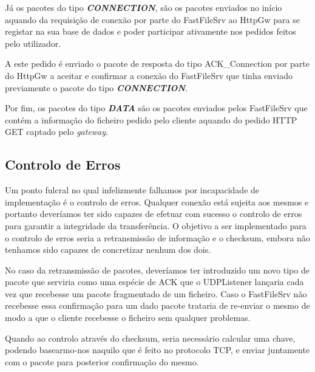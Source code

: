\documentclass[11pt]{article}
\begin{document}
\par Já os pacotes do tipo \textit{\textbf{CONNECTION}}, são os pacotes enviados no início aquando da requisição de conexão por parte do FastFileSrv ao HttpGw para se registar na sua base de dados e poder participar ativamente nos pedidos feitos pelo utilizador.\\

\par A este pedido é enviado o pacote de resposta do tipo ACK\_Connection por parte do HttpGw a aceitar e confirmar a conexão do FastFileSrv que tinha enviado previamente o pacote do tipo \textit{\textbf{CONNECTION}}.\\

\par Por fim, os pacotes do tipo \textit{\textbf{DATA}} são os pacotes enviados pelos FastFileSrv que contém a informação do ficheiro pedido pelo cliente aquando do pedido HTTP GET captado pelo \textit{gateway}.\\

\subsection{Controlo de Erros}

\par Um ponto fulcral no qual infelizmente falhamos por incapacidade de implementação é o controlo de erros. Qualquer conexão está sujeita aos mesmos e portanto deveríamos ter sido capazes de efetuar com sucesso o controlo de erros para garantir a integridade da transferência. O objetivo a ser implementado para o controlo de erros seria a retransmissão de informação e o checksum, embora não tenhamos sido capazes de concretizar nenhum dos dois.

\par No caso da retransmissão de pacotes, deveríamos ter introduzido um novo tipo de pacote que serviria como uma espécie de ACK que o UDPListener lançaria cada vez que recebesse um pacote fragmentado de um ficheiro. Caso o FastFileSrv não recebesse essa confirmação para um dado pacote trataria de re-enviar o mesmo de modo a que o cliente recebesse o ficheiro sem qualquer problemas.\\

\par Quando ao controlo através do checksum, seria necessário calcular uma chave, podendo basearmo-nos naquilo que é feito no protocolo TCP, e enviar juntamente com o pacote para posterior confirmação do mesmo.
\end{document}
